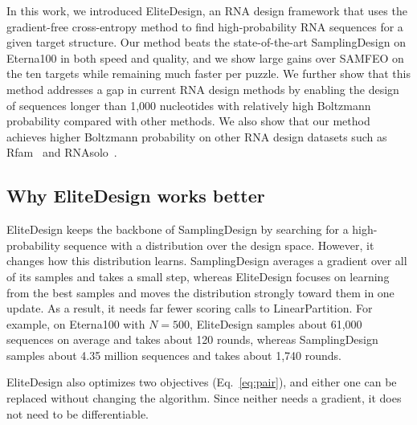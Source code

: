 In this work, we introduced EliteDesign, an RNA design framework that uses the
gradient-free cross-entropy method to find high-probability RNA sequences for a given target structure.
Our method beats the state-of-the-art SamplingDesign on Eterna100 in both
speed and quality, and we show large gains over SAMFEO on the ten
\sixteenS{} targets while remaining much faster per puzzle. We further show that this method addresses a gap in current RNA design
methods by enabling the design of sequences longer than 1,000 nucleotides with relatively high
Boltzmann probability compared with other methods. We also show that our
method achieves higher Boltzmann probability on other RNA design datasets such as Rfam~\citep{taneda2011,kalvari2021}
and RNAsolo~\citep{adamczyk2022}.

\subsection{Why EliteDesign works better}\label{sec:why}
EliteDesign keeps the backbone of SamplingDesign by searching for a high-probability sequence with a distribution over the design space. However, it changes how this distribution learns. SamplingDesign averages a gradient over all of its samples and takes a small step, whereas EliteDesign focuses on learning from the best samples and moves the distribution strongly toward them in one update. As a result, it needs far fewer scoring calls to LinearPartition. For example, on Eterna100 with $N=500$, EliteDesign samples about 61,000 sequences on average and takes about 120 rounds, whereas SamplingDesign samples about 4.35 million sequences and takes about 1,740 rounds.

EliteDesign also optimizes two objectives (Eq.~\ref{eq:pair}), and either one can be replaced without changing the algorithm. Since neither needs a gradient, it does not need to be differentiable.

